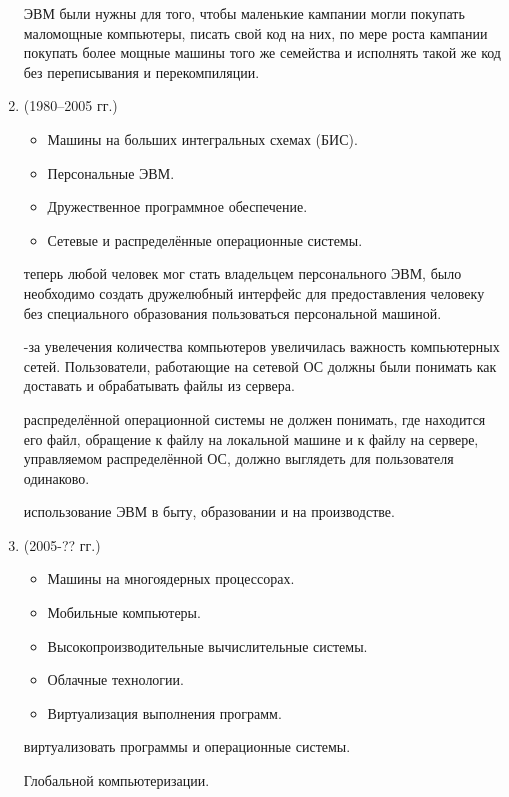 \documentclass[12pt, a4paper]{article}
\newcommand{\mytab}{\hspace{0.5cm}}
\begin{document}
\begin{enumerate}
         ЭВМ были нужны для того, чтобы маленькие кампании могли покупать маломощные компьютеры, 
        писать свой код на них, по мере роста кампании покупать более мощные машины того же семейства и исполнять 
        такой же код без переписывания и перекомпиляции.
        \item[\text{4-й период}] (1980--2005 гг.)
        \begin{itemize}
            \item Машины на больших интегральных схемах (БИС).
            \item Персональные ЭВМ.
            \item Дружественное программное обеспечение.
            \item Сетевые и распределённые операционные системы.
        \end{itemize}
         теперь любой человек мог стать владельцем персонального ЭВМ, 
        было необходимо создать дружелюбный интерфейс для предоставления человеку без 
        специального образования пользоваться персональной машиной.\par
        -за увелечения количества компьютеров увеличилась важность компьютерных 
        сетей. Пользователи, работающие на сетевой ОС должны были понимать как доставать 
        и обрабатывать файлы из сервера.\par
         распределённой операционной системы не 
        должен понимать, где находится его файл, обращение к файлу на локальной машине 
        и к файлу на сервере, управляемом распределённой ОС, должно выглядеть для пользователя 
        одинаково.\par
         использование ЭВМ в быту, образовании и на производстве.
        \item[\text{5-й период}] (2005-?? гг.)
        \begin{itemize}
            \item Машины на многоядерных процессорах.
            \item Мобильные компьютеры.
            \item Высокопроизводительные вычислительные системы.
            \item Облачные технологии.
            \item Виртуализация выполнения программ.
        \end{itemize}
         виртуализовать программы и операционные системы.\par
         Глобальной компьютеризации.
    \end{enumerate}
\end{document}
